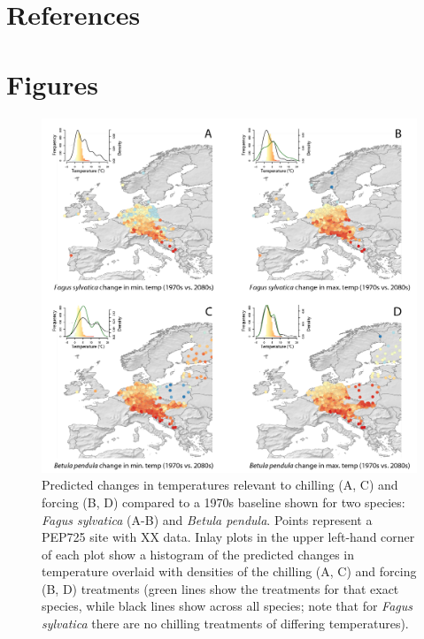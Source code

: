 \documentclass[11pt,letter]{article}
\begin{document}
\section{References}



\section{Figures}

\newpage
\begin{figure}[t!]
\centering
\includegraphics[width=1\textwidth]{figures/Fig1_noblues_densities.png}
\caption{Predicted changes in temperatures relevant to chilling (A, C) and forcing (B, D) compared to a 1970s baseline shown for two species: \emph{Fagus sylvatica} (A-B) and \emph{Betula pendula}. Points represent a PEP725 site with XX data. Inlay plots in the upper left-hand corner of each plot show a histogram of the predicted changes in temperature overlaid with densities of the chilling (A, C) and forcing (B, D) treatments (green lines show the treatments for that exact species, while black lines show across all species; note that for \emph{Fagus sylvatica} there are no chilling treatments of differing temperatures).} %
  \label{fig:pep}
\end{figure}
\end{document}
